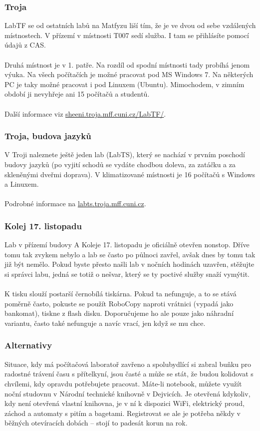 \subsubsection{Troja}
LabTF se od ostatních labů na Matfyzu liší tím, že je ve dvou od sebe vzdálených
místnostech. V přízemí v místnosti T007 sedí služba. I tam se přihlásíte pomocí
údajů z CAS.
\\\\
Druhá místnost je v 1. patře. Na rozdíl od spodní místnosti tady probíhá jenom
výuka. Na všech počítačích je možné pracovat pod MS Windows 7. Na některých PC
je taky možné pracovat i pod Linuxem (Ubuntu). Mimochodem, v zimním období ji
nevyhřeje ani 15 počítačů a studentů.
\\\\
Další informace viz \url{sheeni.troja.mff.cuni.cz/LabTF/}.


\subsubsection{Troja, budova jazyků}
V Troji naleznete ještě jeden lab (LabTS), který se nachází v prvním poschodí
budovy jazyků (po vyjití schodů se vydáte chodbou doleva, za zatáčku a za
skleněnými dveřmi doprava). V klimatizované místnosti je 16 počítačů s Windows a
Linuxem.
\\\\
Podrobné informace na \url{labts.troja.mff.cuni.cz}.


\subsubsection{Kolej 17. listopadu}
Lab v přízemí budovy A Koleje 17. listopadu je oficiálně otevřen nonstop. Dříve
tomu tak zvykem nebylo a lab se často po půlnoci zavřel, avšak dnes by tomu tak
již být nemělo. Pokud byste přesto našli lab v nočních hodinách uzavřen,
stěžujte si správci labu, jedná se totiž o nešvar, který se ty poctivé služby
snaží vymýtit.
\\\\
K tisku slouží postarší černobílá tiskárna. Pokud ta nefunguje, a to se stává
poměrně často, pokuste se použít RoboCopy naproti vrátnici (vypadá jako
bankomat), tiskne z flash disku. Doporučujeme ho ale pouze jako náhradní
variantu, často také nefunguje a navíc vrací, jen když se mu chce.


\subsubsection{Alternativy}
Situace, kdy má počítačová laboratoř zavřeno a spolubydlící si zabral buňku pro
radostné trávení času s přítelkyní, jsou časté a může se stát, že budou
kolidovat s chvílemi, kdy opravdu potřebujete pracovat. Máte-li notebook, můžete
využít noční studovnu v Národní technické knihovně v Dejvicích. Je otevřená
kdykoliv, kdy není otevřená vlastní knihovna, je v ní k dispozici WiFi,
elektrický proud, záchod a automaty s pitím a bagetami. Registrovat se ale je
potřeba někdy v běžných otevíracích dobách – stojí to padesát korun na rok.